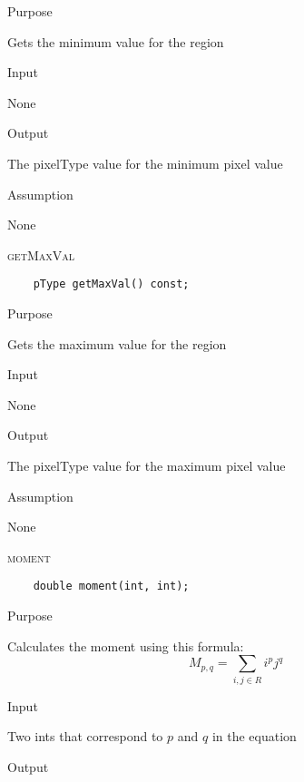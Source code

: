 \documentclass[pdftex, 11pt]{article}
\begin{document}
\begin{description}
\begin{description}
			\item{Purpose}

				Gets the minimum value for the region

			\item{Input}

				None

			\item{Output}

				The pixelType value for the minimum pixel value

			\item{Assumption}

				None

		\end{description}

	\item{\textsc{getMaxVal}}
		\begin{description}
\begin{lstlisting}
	pType getMaxVal() const;
\end{lstlisting}

			\item{Purpose}

				Gets the maximum value for the region

			\item{Input}

				None

			\item{Output}

				The pixelType value for the maximum pixel value

			\item{Assumption}

				None

		\end{description}

	\item{\textsc{moment}}
		\begin{description}
\begin{lstlisting}
	double moment(int, int);
\end{lstlisting}

			\item{Purpose}

				Calculates the moment using this formula:
\[
M_{p,q} = \sum_{i,j \in R} i^{p} j^{q}
\]

			\item{Input}

				Two ints that correspond to $p$ and $q$ in the equation

			\item{Output}


\end{description}
\end{description}
\end{document}
